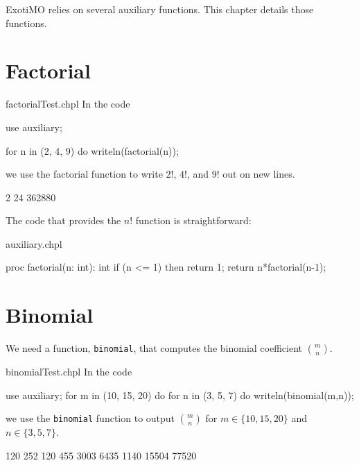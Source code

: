 \label{Auxiliary_Functions}

ExotiMO relies on several auxiliary functions. This chapter details those functions.

\section{Factorial}

\begin{chapeltest}{factorialTest.chpl}
In the code
\begin{chapelpre}
use auxiliary;
\end{chapelpre}
\begin{chapel}
for n in (2, 4, 9) do
  writeln(factorial(n));
\end{chapel}
we use the factorial function to write $2!$, $4!$, and $9!$ out on new lines.
\begin{chapelpost}
\end{chapelpost}
\begin{chapeloutput}
2
24
362880
\end{chapeloutput}
\end{chapeltest}

The code that provides the $n!$ function is straightforward:
\begin{chapelsource}{auxiliary.chpl}
\begin{chapel}
proc factorial(n: int): int{
  if (n <= 1) then return 1;
  return n*factorial(n-1);
}
\end{chapel}
\end{chapelsource}

\section{Binomial}

We need a function, \lstinline{binomial}, that computes the binomial coefficient $\binom{m}{n}$.
\begin{chapeltest}{binomialTest.chpl}
In the code
\begin{chapelpre}
\end{chapelpre}
\begin{chapel}
use auxiliary;
for m in (10, 15, 20) do {
  for n in (3, 5, 7) do {
    writeln(binomial(m,n));
  }
}
\end{chapel}
we use the \lstinline{binomial} function to output $\binom{m}{n}$ 
for $m\in\{10, 15, 20\}$ and $n \in \{3, 5, 7\}$.
\begin{chapelpost}
\end{chapelpost}
\begin{chapeloutput}
120
252
120
455
3003
6435
1140
15504
77520
\end{chapeloutput}
\end{chapeltest}

